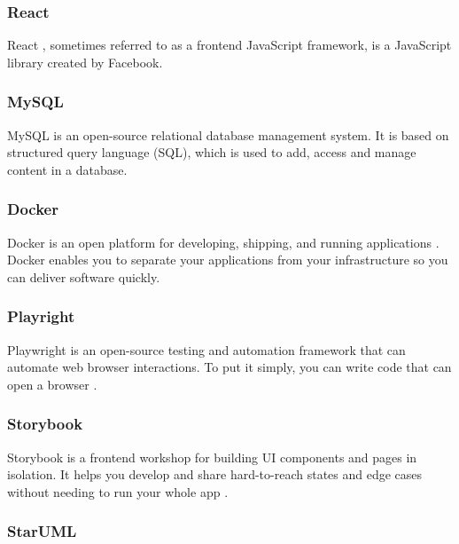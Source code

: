 \subsubsection*{\protect{} React}

React \cite{ReactWebsite}, sometimes referred to as a frontend JavaScript framework, is a JavaScript library created by Facebook.

\subsubsection*{\protect{} MySQL}

MySQL \cite{MySQLWebsite} is an open-source relational database management system. It is based on structured query language (SQL), which is used to add, access and manage content in a database.

\subsubsection*{\protect{} Docker}

Docker is an open platform for developing, shipping, and running applications \cite{DockerArchitecture2023}. Docker enables you to separate your applications from your infrastructure so you can deliver software quickly.

\subsubsection*{\protect{} Playright}

Playwright \cite{PlaywrightDocs2023} is an open-source testing and automation framework that can automate web browser interactions. To put it simply, you can write code that can open a browser \cite{DevOpsFoundation2023}.

\subsubsection*{\protect{} Storybook}

Storybook is a frontend workshop for building UI components and pages in isolation. It helps you develop and share hard-to-reach states and edge cases without needing to run your whole app \cite{MarcotteResponsiveWebDesign2023}.

\subsubsection*{\protect{} StarUML}

